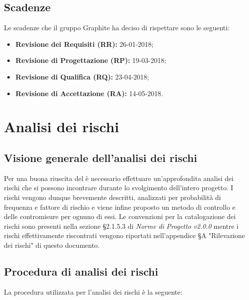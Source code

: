 \documentclass[../PianodiProgetto.tex]{subfiles}
\begin{document}
	\section{Scadenze}
	Le scadenze che il gruppo Graphite ha deciso di rispettare sono le seguenti:
	\begin{itemize}
		\item \textbf{Revisione dei Requisiti (RR):} 26-01-2018;
		\item \textbf{Revisione di Progettazione (RP):} 19-03-2018;
		\item \textbf{Revisione di Qualifica (RQ):} 23-04-2018;
		\item \textbf{Revisione di Accettazione (RA):} 14-05-2018.
	\end{itemize}
	
	\chapter{Analisi dei rischi}
	
	\section{Visione generale dell'analisi dei rischi}
	
	Per una buona riuscita del  è necessario effettuare un'approfondita analisi dei rischi che si possono incontrare durante lo svolgimento dell'intero progetto. I rischi vengono dunque brevemente descritti, analizzati per probabilità di frequenza e fattore di rischio e viene infine proposto un metodo di controllo e delle contromisure per ognuno di essi. Le convenzioni per la catalogazione dei rischi sono presenti nella sezione §2.1.5.3 di \textit{Norme di Progetto v2.0.0} mentre i rischi effettivamente riscontrati vengono riportati nell'appendice §A "Rilevazione dei rischi" di questo documento.
	
	\section{Procedura di analisi dei rischi}
	
	La procedura utilizzata per l'analisi dei rischi è la seguente:
	
\end{document}
